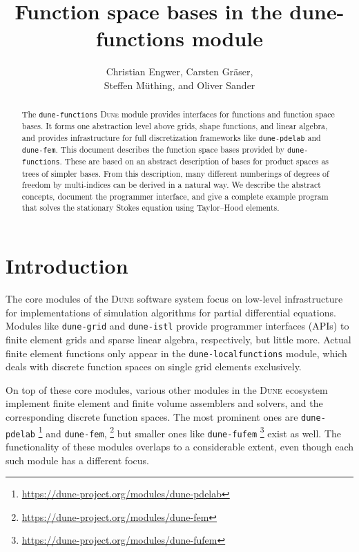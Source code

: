 \documentclass[a4paper,10pt,headings=normal,bibliography=totoc]{scrartcl}
\title{Function space bases in the dune-functions module}
\author{Christian Engwer, Carsten Gräser,\\ Steffen Müthing, and Oliver Sander}
\newcommand{\dune}{\textsc{Dune}\xspace}
\newcommand{\dunemodule}[1]{\texttt{#1}}
\begin{document}
\maketitle

\begin{abstract}
 The \dunemodule{dune-functions} \dune module provides interfaces for functions and function space bases.
 It forms one abstraction level above grids, shape functions, and linear algebra, and provides infrastructure
 for full discretization frameworks like \dunemodule{dune-pdelab} and \dunemodule{dune-fem}.
 This document describes the function space bases provided by \dunemodule{dune-functions}.  These are
 based on an abstract description of bases for product spaces as trees of simpler bases.
 From this description, many different numberings of degrees of freedom by multi-indices can be
 derived in a natural way. We describe the abstract concepts, document the programmer interface,
 and give a complete example program that solves the stationary Stokes equation using Taylor--Hood elements.
\end{abstract}

\section*{Introduction}

The core modules of the \dune software system focus on low-level infrastructure for
implementations of simulation algorithms for partial differential equations.  Modules like
\dunemodule{dune-grid} and \dunemodule{dune-istl} provide programmer interfaces (APIs) to finite element grids
and sparse linear algebra, respectively, but little more. Actual finite element functions only
appear in the \dunemodule{dune-localfunctions} module, which deals with discrete function spaces
on single grid elements exclusively.

On top of these core modules, various other modules in the \dune ecosystem implement finite element and finite volume assemblers
and solvers, and the corresponding discrete function spaces. The most prominent ones are
\dunemodule{dune-pdelab}%
\footnote{\url{https://dune-project.org/modules/dune-pdelab}}
%
and \dunemodule{dune-fem},%
\footnote{\url{https://dune-project.org/modules/dune-fem}}
%
but smaller ones like \dunemodule{dune-fufem}%
\footnote{\url{https://dune-project.org/modules/dune-fufem}}
%
exist as well.  The functionality of these modules overlaps to a considerable extent, even though
each such module has a different focus.
\end{document}
